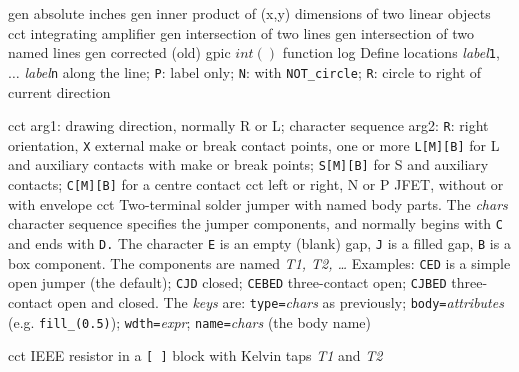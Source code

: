   {gen}%
  {absolute inches}%
%
  {gen}%
  {inner product of (x,y) dimensions of two linear objects}%
%
  {cct}%
  {integrating amplifier}%
%
  {gen}%
  {intersection of two lines}%
%
  {gen}%
  {intersection of two named lines}%
%
  {gen}%
  {corrected (old) gpic $int()$ function}%
%
  {log}%
  {Define locations {\sl label}{\tt 1}, $\ldots$ {\sl label}{\tt n}
    along the line; {\tt P}: label only;
    {\tt N}: with {\tt NOT\_circle};
    {\tt R}: circle to right of current direction }%

%

%
  {cct}%
  {arg1: drawing direction, normally R or L;
   character sequence arg2: {\tt R}: right orientation,
   {\tt X} external make or break contact points,
   one or more {\tt L[M][B]} for L and auxiliary contacts with make or break
   points; {\tt S[M][B]} for S and auxiliary contacts;
   {\tt C[M][B]} for a centre contact
   }%
%
  {cct}%
  {left or right, N or P JFET, without or with envelope
    }%
%
  {cct}%
  { Two-terminal solder jumper with named body parts.
    The {\sl chars} character sequence specifies the jumper components,
    and normally begins with {\tt C} and ends with {\tt D.} The character
    {\tt E} is an empty (blank) gap, {\tt J} is a filled gap, {\tt B}
    is a box component.  The components are named {\sl T1, T2, \ldots}
    Examples: {\tt CED} is a simple open jumper (the default); {\tt CJD}
    closed; {\tt CEBED} three-contact open; {\tt CJBED} three-contact
    open and closed.
    The {\sl keys} are: {\tt type=}{\sl chars} as previously;
                        {\tt body=}{\sl attributes} (e.g. {\tt fill\_(0.5)});
                        {\tt wdth=}{\sl expr};
                        {\tt name=}{\sl chars} (the body name)%
}%

%

%
  {cct}%
  {IEEE resistor in a {\tt [ ]} block with Kelvin taps {\sl T1} and {\sl T2}
   }%

